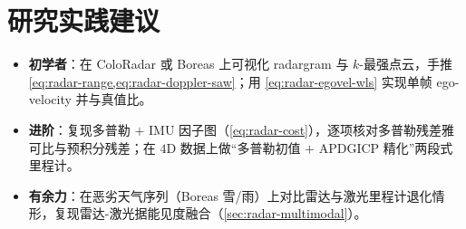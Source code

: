 \section*{研究实践建议}
\begin{itemize}
  \item \textbf{初学者}：在 ColoRadar 或 Boreas 上可视化 radargram 与 $k$-最强点云，手推 \cref{eq:radar-range,eq:radar-doppler-saw}；用 \cref{eq:radar-egovel-wls} 实现单帧 ego-velocity 并与真值比。
  \item \textbf{进阶}：复现多普勒 $+$ IMU 因子图（\cref{eq:radar-cost}），逐项核对多普勒残差雅可比与预积分残差；在 $4$D 数据上做“多普勒初值 $+$ APDGICP 精化”两段式里程计。
  \item \textbf{有余力}：在恶劣天气序列（Boreas 雪/雨）上对比雷达与激光里程计退化情形，复现雷达-激光据能见度融合（\cref{sec:radar-multimodal}）。
\end{itemize}
